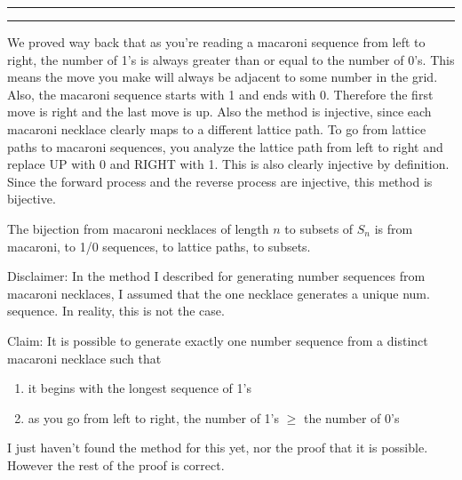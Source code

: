 \documentclass[11pt]{article}
\newcounter{questionCounter}
\newcounter{partCounter}[questionCounter]
\newenvironment{question}[2][\arabic{questionCounter}]{%
    \setcounter{partCounter}{0}%
    \vspace{.25in} \hrule \vspace{0.5em}%
        \noindent{\bf #2}%
    \vspace{0.8em} \hrule \vspace{.10in}%
    \addtocounter{questionCounter}{1}%
}{}
\begin{document}
\begin{question}{Macaroni Revisited}
We proved way back that as
you're reading a macaroni sequence from left to right, the number of 1's is always
greater than or equal to the number of 0's. This means the move you make will always
be adjacent to some number in the grid. Also, the macaroni sequence starts with 1 and 
ends with 0. Therefore the first move is right and the last move is up.  Also 
the method is injective, since each macaroni necklace 
clearly maps to a different lattice path. To go from lattice paths to macaroni
sequences, you analyze the lattice path from left to right and replace UP with 0 and 
RIGHT with 1. This is also clearly injective by definition. Since the forward process
and the reverse process are injective, this method is bijective.

The bijection from macaroni necklaces of length $n$ to subsets of $S_n$ 
is from macaroni, to 1/0 sequences, to lattice paths, to subsets.

Disclaimer: In the method I described for generating number sequences from 
macaroni necklaces, I assumed that the one necklace generates a unique num.
sequence. In reality, this is not the case.

Claim: It is possible to generate exactly one number sequence from a distinct macaroni
necklace such that 
\begin{enumerate}
\item it begins with the longest sequence of 1's
\item as you go from left to right, the number of 1's $\geq$ the number of 0's
\end{enumerate}

I just haven't found the method for this yet, nor the proof that it is possible.
However the rest of the proof is correct.
\end{question}
\end{document}
